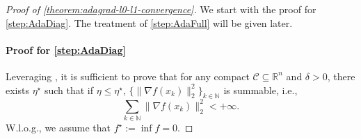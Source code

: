 \documentclass{article}
\theoremstyle{plain}
\theoremstyle{definition}
\theoremstyle{remark}
\newcommand*{\RR}{\mathbb{R}}
\newcommand*{\NN}{\mathbb{N}}
\begin{document}
\begin{proof}[Proof of \cref{theorem:adagrad-l0-l1-convergence}]  
    We start with the proof for \ref{step:AdaDiag}. The treatment of \ref{step:AdaFull} will be given later.
    \paragraph{Proof for \ref{step:AdaDiag}} 
    Leveraging , it is sufficient to prove that for any compact $\mathcal{C} \subseteq \RR^n$ and $\delta > 0$, there exists $\eta^\star$ such that if $\eta \leq \eta^\star$,
    $\{\|\nabla f(x_k)\|_2^2\}_{k\in\NN}$ is summable, i.e.,
    \begin{equation*}
        \sum_{k \in \NN} \|\nabla f(x_k)\|_2^2 < +\infty.
    \end{equation*}
    W.l.o.g., we assume that $f^\star := \inf f = 0$.


\end{proof}
\end{document}

